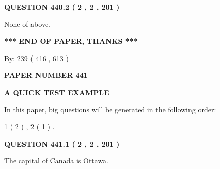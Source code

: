 \documentclass[12pt]{article}
\begin{document}
 
  
\vspace{0.2in}
  
{\textbf{\Large{QUESTION
440.2 
 ( 2 , 2 , 201 )
}}}
  
  
 
 
\noindent{}
 
 
 None of above.
 
 
 
 
   
   
 \vspace{0.2in}
 
   
   
   
   
\vspace{1.0in} 
{\textbf{\large{ *** END OF PAPER, THANKS *** }}} 
   
   
\hspace{1.0in} By: 
 239 ( 416 ,  613 )
   
   
   
   
\newpage 
\setcounter{page}{ 
   441001 } 
   
   
   
   
 {\textbf{ \Large{ PAPER NUMBER  441  }}}
   
   
\vspace{0.2in}
   
   
   
   
   
   
 \vspace{0.2in}
{\LARGE {\textbf{ A QUICK TEST EXAMPLE}}}
   
   
   
\vspace{0.2in}
   
In this paper, big questions will be generated in the following order: 
   
   
   1 ( 2 )
 ,
   2 ( 1 )
 .
  
\vspace{0.2in}
  
{\textbf{\Large{QUESTION
441.1 
 ( 2 , 2 , 201 )
}}}
  
  
 
 
\noindent{}
 
 
The capital of Canada is Ottawa.
 
\end{document}
